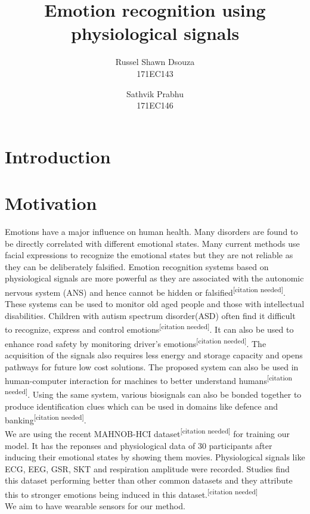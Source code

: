 \documentclass[11pt]{article}
\title{\textbf{Emotion recognition using physiological signals}}
\author{
  Russel Shawn Dsouza\\
  171EC143
  \and
  Sathvik Prabhu\\
  171EC146
}
\date{}
\theoremstyle{definition}
\begin{document}
  \maketitle

  \section{Introduction}

  \section{Motivation}

Emotions have a major influence on human health. Many disorders are found to be directly correlated with different emotional states.  Many current methods use facial expressions to recognize the emotional states but they are not reliable as they can be deliberately falsified. Emotion recognition systems based on physiological signals are more powerful as they are associated with the autonomic nervous system (ANS) and hence cannot be hidden or falsified\textsuperscript{[citation needed]}. These systems can be used to monitor old aged people and those with intellectual disabilities. Children with autism spectrum disorder(ASD) often find it difficult to recognize, express and control emotions\textsuperscript{[citation needed]}. It can also be used to enhance road safety by monitoring driver's emotions\textsuperscript{[citation needed]}. The acquisition of the signals also requires less energy and storage capacity and opens pathways for future low cost solutions. The proposed system can also be used in human-computer interaction for machines to better understand humans\textsuperscript{[citation needed]}. Using the same system, various biosignals can also be bonded together to produce identification clues which can be used in domains like defence and banking\textsuperscript{[citation needed]}.\\

We are using the recent MAHNOB-HCI dataset\textsuperscript{[citation needed]} for training our model. It has the reponses and physiological data of 30 participants after inducing their emotional states by showing them movies. Physiological signals like ECG, EEG, GSR, SKT and respiration amplitude were recorded. Studies find this dataset performing better than other common datasets and they attribute this to stronger emotions being induced in this dataset.\textsuperscript{[citation needed]}\\
We aim to have wearable sensors for our method.
\end{document}

